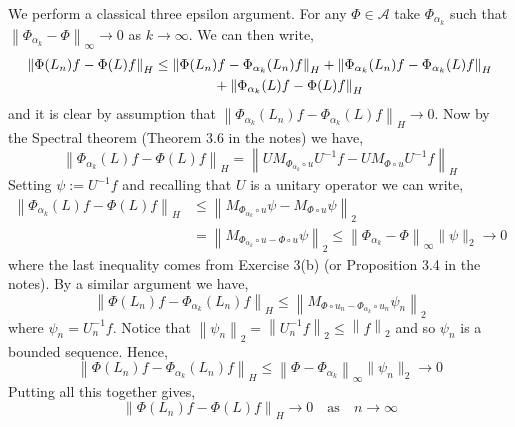 We perform a classical three epsilon argument. For any $\Phi\in\mathcal{A}$ take $\Phi_{\alpha_{k}}$ such that $\left\|\Phi_{\alpha_{k}}-\Phi\right\|_{\infty}\to 0$ as $k\to\infty$. We can then write,
\begin{equation*}
	\begin{aligned}
		\left\|\Phi(L_{n})f - \Phi(L)f\right\|_{H} &\leq \left\|\Phi(L_{n})f - \Phi_{\alpha_{k}}(L_{n})f\right\|_{H} + \left\|\Phi_{\alpha_{k}}(L_{n})f - \Phi_{\alpha_{k}}(L)f\right\|_{H}\\
		&\hspace{15mm}+ \left\|\Phi_{\alpha_{k}}(L)f - \Phi(L)f\right\|_{H}
	\end{aligned}
\end{equation*}
and it is clear by assumption that $\left\|\Phi_{\alpha_{k}}(L_{n})f - \Phi_{\alpha_{k}}(L)f\right\|_{H}\to 0$. Now by the Spectral theorem (Theorem 3.6 in the notes) we have,
\begin{equation*}
	\left\|\Phi_{\alpha_{k}}(L)f - \Phi(L)f\right\|_{H} = \left\|UM_{\Phi_{\alpha_{k}}\circ u}U^{-1}f - UM_{\Phi\circ u}U^{-1}f\right\|_{H}
\end{equation*}
Setting $\psi:=U^{-1}f$ and recalling that $U$ is a unitary operator we can write,
\begin{equation*}
	\begin{aligned}
		\left\|\Phi_{\alpha_{k}}(L)f - \Phi(L)f\right\|_{H} &\leq \left\|M_{\Phi_{\alpha_{k}}\circ u}\psi - M_{\Phi\circ u}\psi\right\|_{2}\\
		&= \left\|M_{\Phi_{\alpha_{k}}\circ u - \Phi\circ u}\psi\right\|_{2} \leq \left\|\Phi_{\alpha_{k}} - \Phi\right\|_{\infty}\|\psi\|_{2}\to 0
	\end{aligned}
\end{equation*}
where the last inequality comes from Exercise 3(b) (or Proposition 3.4 in the notes). By a similar argument we have,
\begin{equation*}
	\left\|\Phi(L_{n})f - \Phi_{\alpha_{k}}(L_{n})f\right\|_{H} \leq \left\|M_{\Phi\circ u_{n} - \Phi_{\alpha_{k}}\circ u_{n}}\psi_{n}\right\|_{2}
\end{equation*}
where $\psi_{n} = U^{-1}_{n}f$. Notice that $\left\|\psi_{n}\right\|_{2} = \left\|U^{-1}_{n}f\right\|_{2}\leq \left\|f\right\|_{2}$ and so $\psi_{n}$ is a bounded sequence. Hence,
\begin{equation*}
	\left\|\Phi(L_{n})f - \Phi_{\alpha_{k}}(L_{n})f\right\|_{H} \leq \left\|\Phi - \Phi_{\alpha_{k}}\right\|_{\infty}\|\psi_{n}\|_{2}\to 0
\end{equation*}
Putting all this together gives,
\begin{equation*}
	\left\|\Phi(L_{n})f - \Phi(L)f\right\|_{H}\to 0 \quad \text{as} \quad n\to\infty
\end{equation*}
